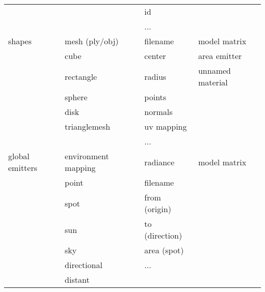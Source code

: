 \begin{center}
\begin{tabular}{ l | l | l | l }
			& 				& id				&			\\
			& 				& ...				&			\\ \hline
    shapes		& mesh (ply/obj)		& filename			& model matrix		\\
			& cube				& center			& area emitter		\\
			& rectangle			& radius			& unnamed material	\\
			& sphere			& points			&			\\
			& disk				& normals			&			\\
			& trianglemesh			& uv mapping			&			\\
			& 				& ...				&			\\ \hline
    global emitters	& environment mapping		& radiance			& model matrix		\\
			& point				& filename			& 			\\
			& spot				& from (origin)			&			\\
			& sun				& to (direction)		&			\\
			& sky				& area (spot)			&			\\
			& directional			& ...				&			\\
			& distant			&				&			\\
    \end{tabular}
\end{center}
    